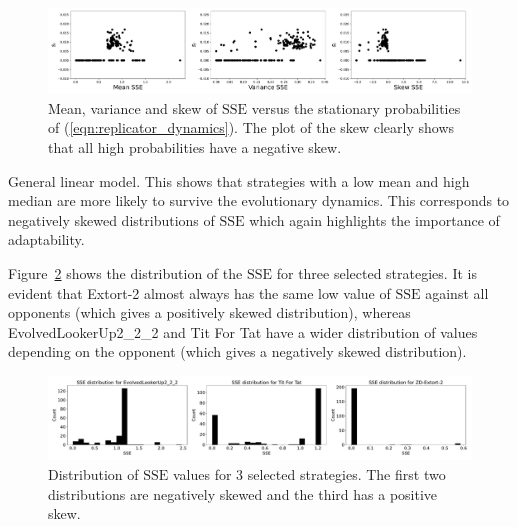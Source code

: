 \documentclass[a4paper]{article}
\newcommand{\SSe}{\text{SSE}}
\begin{document}
\begin{figure}[!hbtp]
    \centering
    \includegraphics[width=\textwidth]{./assets/img/compare-evolutionary-dynamics-to-sserror/main.pdf}
    \caption{Mean, variance and skew of \(\SSe\) versus the stationary
    probabilities of (\ref{eqn:replicator_dynamics}). The plot of the skew
    clearly shows that all high probabilities have a negative skew.}
    \label{fig:compare-evolutionary-dynamics-to-sserror}
\end{figure}

\begin{table}[!hbtp]
    \begin{center}
    \tiny
    
    \end{center}
    \caption{General linear model. This shows that strategies with a low mean
    and high median are more likely to survive the evolutionary dynamics. This
    corresponds to negatively skewed distributions of \(\SSe\) which again
    highlights the importance of adaptability.}
    \label{tbl:compare-evolutionary-dynamics-to-sserror}
\end{table}

Figure~\ref{fig:sserror_distribution_for_selection_of_strategies} shows the
distribution of the \(\SSe\) for three selected strategies. It is evident that
Extort-2 almost always has the same low value of \(\SSe\) against all opponents
(which gives a positively skewed distribution), whereas EvolvedLookerUp2\_2\_2
and Tit For Tat have a wider distribution of values depending on the opponent
(which gives a negatively skewed distribution).

\begin{figure}[!hbtp]
    \centering
    \includegraphics[width=\textwidth]{./assets/img/sserror_distribution_for_selection_of_strategies/main.pdf}
    \caption{Distribution of \(\SSe\) values for 3 selected strategies. The
    first two distributions are negatively skewed and the third has a positive
    skew.}
    \label{fig:sserror_distribution_for_selection_of_strategies}
\end{figure}
\end{document}
